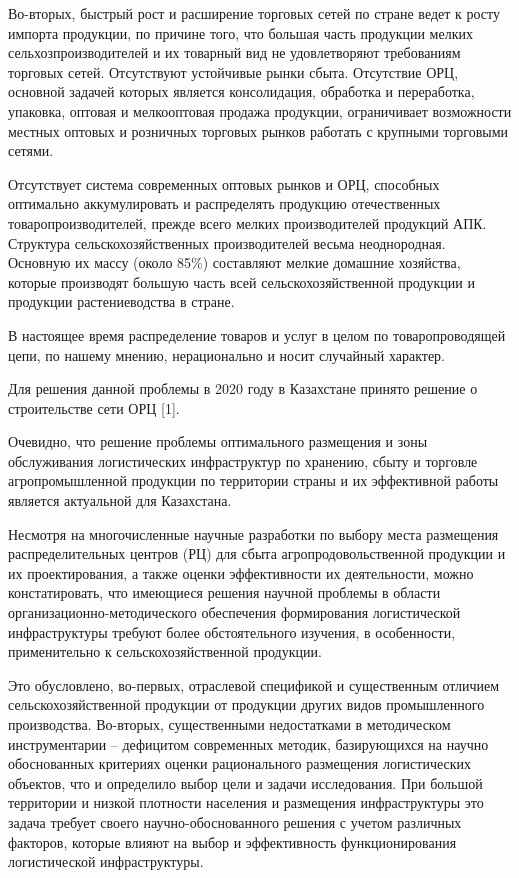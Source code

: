 \begin{multicols}{2}
Во-вторых, быстрый рост и расширение торговых сетей по стране ведет к
росту импорта продукции, по причине того, что большая часть продукции
мелких сельхозпроизводителей и их товарный вид не удовлетворяют
требованиям торговых сетей. Отсутствуют устойчивые рынки сбыта.
Отсутствие ОРЦ, основной задачей которых является консолидация,
обработка и переработка, упаковка, оптовая и мелкооптовая продажа
продукции, ограничивает возможности местных оптовых и розничных торговых
рынков работать с крупными торговыми сетями.

Отсутствует система современных оптовых рынков и ОРЦ, способных
оптимально аккумулировать и распределять продукцию отечественных
товаропроизводителей, прежде всего мелких производителей продукций АПК.
Структура сельскохозяйственных производителей весьма неоднородная.
Основную их массу (около 85\%) составляют мелкие домашние хозяйства,
которые производят большую часть всей сельскохозяйственной продукции и
продукции растениеводства в стране.

В настоящее время распределение товаров и услуг в целом по
товаропроводящей цепи, по нашему мнению, нерационально и носит случайный
характер.

Для решения данной проблемы в 2020 году в Казахстане принято решение о
строительстве сети ОРЦ {[}1{]}.

Очевидно, что решение проблемы оптимального размещения и зоны
обслуживания логистических инфраструктур по хранению, сбыту и торговле
агропромышленной продукции по территории страны и их эффективной работы
является актуальной для Казахстана.

Несмотря на многочисленные научные разработки по выбору места размещения
распределительных центров (РЦ) для сбыта агропродовольственной продукции
и их проектирования, а также оценки эффективности их деятельности, можно
констатировать, что имеющиеся решения научной проблемы в области
организационно-методического обеспечения формирования логистической
инфраструктуры требуют более обстоятельного изучения, в особенности,
применительно к сельскохозяйственной продукции.

Это обусловлено, во-первых, отраслевой спецификой и существенным
отличием сельскохозяйственной продукции от продукции других видов
промышленного производства. Во-вторых, существенными недостатками в
методическом инструментарии -- дефицитом современных методик,
базирующихся на научно обоснованных критериях оценки рационального
размещения логистических объектов, что и определило выбор цели и задачи
исследования. При большой территории и низкой плотности населения и
размещения инфраструктуры это задача требует своего научно-обоснованного
решения с учетом различных факторов, которые влияют на выбор и
эффективность функционирования логистической инфраструктуры.


\end{multicols}
